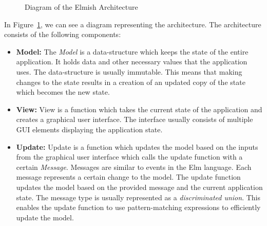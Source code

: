 \begin{figure}[htbp]
	\caption{Diagram of the Elmish Architecture}
	\label{fig:elm}
\end{figure}

In Figure~\ref{fig:elm}, we can see a diagram representing the architecture.
The architecture consists of the following components:
\begin{itemize}
	\item \textbf{Model:} The \emph{Model} is a data-structure which keeps the state of the entire application. It
	      holds data and other necessary values that the application uses.
	      The data-structure is usually immutable.
	      This means that making changes to the state results in a creation
	      of an updated copy of the state which becomes the new state.

	\item \textbf{View:} View is a function which takes the current state of the application and creates a
	      graphical user interface. The interface usually consists of multiple GUI elements displaying the application state.

	\item \textbf{Update:} Update is a function which updates the model based on the inputs from the graphical user interface which calls the update function with a certain \emph{Message}.
	      Messages are similar to events in the Elm language. Each message represents a certain change to the model.
	      The update function updates the model based on the provided message and the current application state.
	      The message type is usually represented as a \emph{discriminated union}.
	      This enables the update function to use pattern-matching expressions to efficiently update the model.
\end{itemize}

